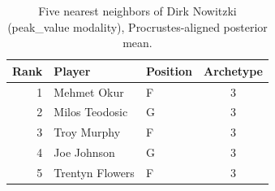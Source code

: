 \begin{table}[htbp]
  \centering\small
  \begin{tabular}{rllc}
    \toprule
    Rank & Player & Position & Archetype \\
    \midrule
    1 & Mehmet Okur & F & 3 \\
    2 & Milos Teodosic & G & 3 \\
    3 & Troy Murphy & F & 3 \\
    4 & Joe Johnson & G & 3 \\
    5 & Trentyn Flowers & F & 3 \\
    \bottomrule
  \end{tabular}
  \caption{Five nearest neighbors of Dirk Nowitzki (peak_value modality), Procrustes-aligned posterior mean.}
  \label{tab:Dirk_Nowitzki_neighbors_peak_value}
\end{table}

